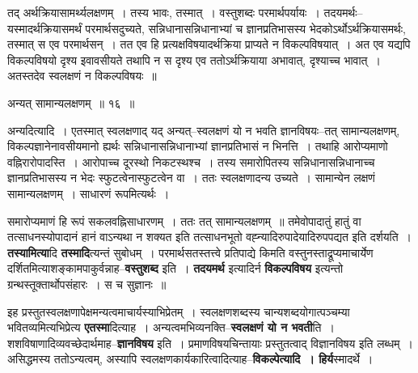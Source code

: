 \documentclass[article,12pt,a4paper]{memoir}
\begin{document}
	तद् अर्थक्रियासामर्थ्यलक्षणम् । तस्य भावः, तस्मात् । वस्तुशब्दः परमार्थपर्यायः । तदयमर्थः--यस्मादर्थक्रियासमर्थं परमार्थसदुच्यते, सन्निधानासन्निधानाभ्यां च ज्ञानप्रतिभासस्य भेदकोऽर्थोऽर्थक्रियासमर्थः, तस्मात् स एव परमार्थसन् । तत एव हि प्रत्यक्षविषयादर्थक्रिया प्राप्यते न विकल्पविषयात् । अत एव यद्यपि विकल्पविषयो दृश्य इवावसीयते तथापि न स दृश्य एव ततोऽर्थक्रियाया अभावात्, दृश्याच्च भावात् । अतस्तदेव स्वलक्षणं न विकल्पविषयः ॥  
	  
	अन्यत् सामान्यलक्षणम् ॥ १६ ॥ 
	  
	अन्यदित्यादि । एतस्मात् स्वलक्षणाद् यद् अन्यत्--स्वलक्षणं यो न भवति ज्ञानविषयः--तत् सामान्यलक्षणम्, विकल्पज्ञानेनावसीयमानो ह्यर्थः सन्निधानासन्निधानाभ्यां ज्ञानप्रतिभासं न भिनत्ति । तथाहि आरोप्यमाणो वह्निरारोपादस्ति । आरोपाच्च दूरस्थो निकटस्थश्च । तस्य समारोपितस्य सन्निधानासन्निधानाच्च ज्ञानप्रतिभासस्य न भेदः स्फुटत्वेनास्फुटत्वेन वा । ततः स्वलक्षणादन्य उच्यते । सामान्येन लक्षणं सामान्यलक्षणम् । साधारणं रूपमित्यर्थः ।  
	  
	समारोप्यमाणं हि रूपं सकलवह्निसाधारणम् । ततः तत् सामान्यलक्षणम् ॥ तमेवोपादातुं हातुं वा तत्साधनस्योपादानं हानं वाऽन्यथा न शक्यत इति तत्साधनभूतो वह्न्यादिरुपादेयादिरुपपद्यत इति दर्शयति । \textbf{तस्यामित्या}दि \textbf{तस्मादि}त्यन्तं सुबोधम् । परमार्थसतस्तत्त्वे प्रतिपाद्ये किमति वस्तुनस्ताद्रूप्यमाचार्येण दर्शितमित्याशङ्कामपाकुर्वन्नाह--\textbf{वस्तुशब्द} इति । \textbf{तदयमर्थ} इत्यादिर्न \textbf{विकल्पविषय} इत्यन्तो ग्रन्थस्तूक्तार्थोपसंहारः । स च सुज्ञानः ॥
	\pend
      

	  \pstart इह प्रस्तुतस्वलक्षणापेक्षमन्यत्वमाचार्यस्याभिप्रेतम् । स्वलक्षणशब्दस्य चान्यशब्दयोगात्पञ्चम्या भवितव्यमित्यभिप्रेत्य \textbf{एतस्मा}दित्याह । अन्यत्वमभिव्यनक्ति--\textbf{स्वलक्षणं यो न भवती}ति । शशविषाणादिव्यवच्छेदार्थमाह--\textbf{ज्ञानविषय} इति । प्रमाणविषयचिन्तायाः प्रस्तुतत्वाद् विज्ञानविषय इति लब्धम् । असिद्धमस्य ततोऽन्यत्वम्, अस्यापि स्वलक्षणकार्यकारित्वादित्याह--\textbf{विकल्पेत्यादि । हिर्य}स्मादर्थे ।
	\pend
      
\end{document}
